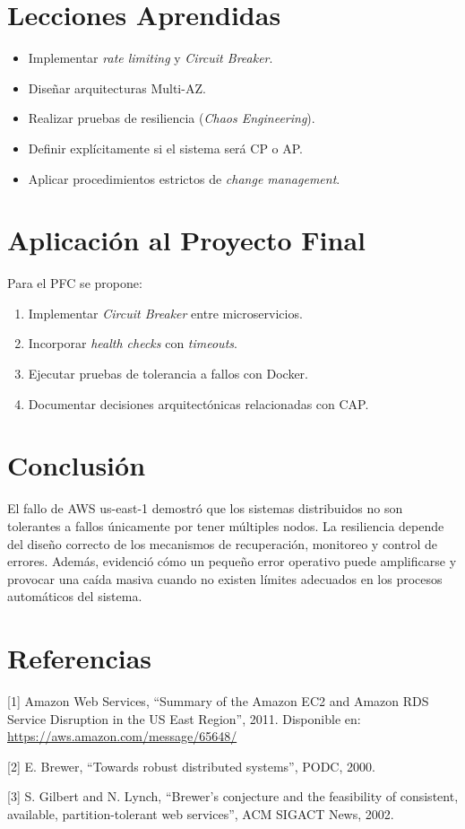 \documentclass[10pt, a4paper]{article}
\begin{document}
\section{Lecciones Aprendidas}

\begin{itemize}[noitemsep]
    \item Implementar \textit{rate limiting} y \textit{Circuit Breaker}.
    \item Diseñar arquitecturas Multi-AZ.
    \item Realizar pruebas de resiliencia (\textit{Chaos Engineering}).
    \item Definir explícitamente si el sistema será CP o AP.
    \item Aplicar procedimientos estrictos de \textit{change management}.
\end{itemize}

\section{Aplicación al Proyecto Final}

Para el PFC se propone:

\begin{enumerate}[noitemsep]
    \item Implementar \textit{Circuit Breaker} entre microservicios.
    \item Incorporar \textit{health checks} con \textit{timeouts}.
    \item Ejecutar pruebas de tolerancia a fallos con Docker.
    \item Documentar decisiones arquitectónicas relacionadas con CAP.
\end{enumerate}

\section{Conclusión}

El fallo de AWS us-east-1 demostró que los sistemas distribuidos no son tolerantes a fallos únicamente por tener múltiples nodos. La resiliencia depende del diseño correcto de los mecanismos de recuperación, monitoreo y control de errores. Además, evidenció cómo un pequeño error operativo puede amplificarse y provocar una caída masiva cuando no existen límites adecuados en los procesos automáticos del sistema.

\vspace{0.3cm}

\section*{Referencias}

\small

[1] Amazon Web Services, ``Summary of the Amazon EC2 and Amazon RDS Service Disruption in the US East Region'', 2011. Disponible en: \url{https://aws.amazon.com/message/65648/}

[2] E. Brewer, ``Towards robust distributed systems'', PODC, 2000.

[3] S. Gilbert and N. Lynch, ``Brewer's conjecture and the feasibility of consistent, available, partition-tolerant web services'', ACM SIGACT News, 2002.
\end{document}
